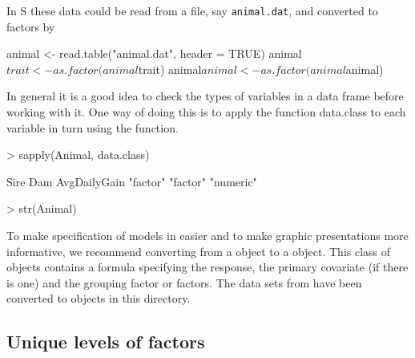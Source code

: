 \documentclass[12pt]{article}
\newcommand{\s}{\textsf{S}}
\begin{document}
In \s{} these data could be read from a file, say \texttt{animal.dat},
and converted to factors by
\begin{Schunk}
\begin{Sinput}
animal <- read.table("animal.dat", header = TRUE)
animal$trait <- as.factor(animal$trait)
animal$animal <- as.factor(animal$animal)
\end{Sinput}
\end{Schunk}
In general it is a good idea to check the types of variables in a data 
frame before working with it.  One way of doing this is to apply
the function \textsf{data.class} to each variable in turn using the
 function.
\begin{Schunk}
\begin{Sinput}
> sapply(Animal, data.class)
\end{Sinput}
\begin{Soutput}
        Sire          Dam AvgDailyGain 
    "factor"     "factor"    "numeric" 
\end{Soutput}
\begin{Sinput}
> str(Animal)
\end{Sinput}
\end{Schunk}

To make specification of models in  easier and to make graphic
presentations more informative, we recommend converting from a
 object to a  object.  This class of
objects contains a formula specifying the response, the primary
covariate (if there is one) and the grouping factor or factors.  The
data sets from \citet{litt:mill:stro:wolf:1996} have been
converted to  objects in this directory.

\subsection{Unique levels of factors}
\label{sec:nested}
\end{document}
